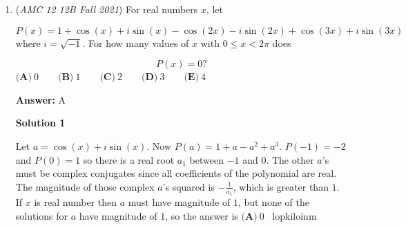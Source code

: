 \begin{enumerate}
 
5. The total number of operators are

 $|G| = 1 + 3\cdot3 + 4\cdot2 + 6\cdot1 = 24$

 Based on 1, 2, 3, 4 the total number of stabilizers is $70 + 30 + 32 + 36 = 168$

 therefore the number of orbits $= \frac{168}{G=24} = \boxed{7}$




\textbf{Solution 5 (Quick 'n Easy but not rigorous)}

Since rotations of a single pattern are considered indistinguishable, we can assume that the forward upper right corner of the 2-by-2-by-2 cube is a blue cube (since we can always rotate the big cube to place a blue cube in that spot).

 Once we've assigned this cube to be blue, we note that 3 1-by-1-by-1 cubes share a side with it, 3 1-by-1-by-1 cubes share a corner with it, and 1 1-by-1-by-1 cube does not touch the assigned cube at all, from the perspective of someone who can only see the cube's faces. We'll call the first 3 "adjacent", the second 3 "cornering", and the last one "opposite."

 We can use a little bit of intuition to confirm that due to the rotation condition, we should treat all adjacents as indistinguishable, all cornerings as indistinguishable, and of course the opposite one is unique from all the others. Thus, we can list out like so (keeping in mind that there are 3 adjacents, 3 cornerings, and 1 opposite, and that we're choosing the positions of the remaining 3 blue cubes):

 OAA, OAC, OCC, CCC, CAA, CCA, AAA.

 This gives the answer to be $\boxed{\textbf{(A)}\ 7}$.

 


	\item (\textit{AMC 12 12B Fall 2021}) For real numbers $x$, let 

 \[P(x)=1+\cos(x)+i\sin(x)-\cos(2x)-i\sin(2x)+\cos(3x)+i\sin(3x)\]
where $i = \sqrt{-1}$. For how many values of $x$ with $0\leq x<2\pi$ does 

 \[P(x)=0?\]
$\textbf{(A)}\ 0 \qquad\textbf{(B)}\  1 \qquad\textbf{(C)}\  2 \qquad\textbf{(D)}\ 3 \qquad\textbf{(E)}\ 4$

 \textbf{Answer: }A



\textbf{Solution 1}

Let $a=\cos(x)+i\sin(x)$. Now $P(a)=1+a-a^2+a^3$. $P(-1)=-2$ and $P(0)=1$ so there is a real root $a_1$ between $-1$ and $0$. The other $a$'s must be complex conjugates since all coefficients of the polynomial are real. The magnitude of those complex $a$'s squared is $-\frac{1}{a_1}$, which is greater than $1$. If $x$ is real number then $a$ must have magnitude of $1$, but none of the solutions for $a$ have magnitude of $1$, so the answer is $\boxed{\textbf{(A)}\ 0 }$ ~lopkiloinm


\end{enumerate}
